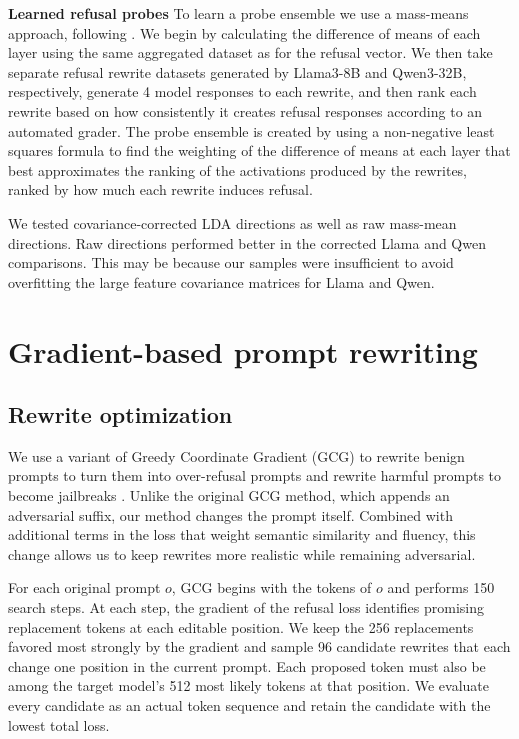 \documentclass{article}
\begin{document}
\textbf{Learned refusal probes}
    To learn a probe ensemble we use a mass-means approach, following \citet{marks2024geometry}. We begin by calculating the difference of means of each layer using the same aggregated dataset as for the refusal vector. We then take separate refusal rewrite datasets generated by Llama3-8B and Qwen3-32B, respectively, generate 4 model responses to each rewrite, and then rank each rewrite based on how consistently it creates refusal responses according to an automated grader. The probe ensemble is created by using a non-negative least squares formula to find the weighting of the difference of means at each layer that best approximates the ranking of the activations produced by the rewrites, ranked by how much each rewrite induces refusal.

    We tested covariance-corrected LDA directions as well as raw mass-mean directions. Raw directions performed better in the corrected Llama and Qwen comparisons. This may be because our samples were insufficient to avoid overfitting the large feature covariance matrices for Llama and Qwen.
    
\section{Gradient-based prompt rewriting}

\subsection{Rewrite optimization}

We use a variant of Greedy Coordinate Gradient (GCG) to rewrite benign prompts to turn them into over-refusal prompts and rewrite harmful prompts to become jailbreaks \citep{zou2023universal}. Unlike the original GCG method, which appends an adversarial suffix, our method changes the prompt itself. Combined with additional terms in the loss that weight semantic similarity and fluency, this change allows us to keep rewrites more realistic while remaining adversarial.

For each original prompt \(o\), GCG begins with the tokens of \(o\) and performs 150 search steps. At each step, the gradient of the refusal loss identifies promising replacement tokens at each editable position. We keep the 256 replacements favored most strongly by the gradient and sample 96 candidate rewrites that each change one position in the current prompt. Each proposed token must also be among the target model's 512 most likely tokens at that position. We evaluate every candidate as an actual token sequence and retain the candidate with the lowest total loss.
\end{document}
